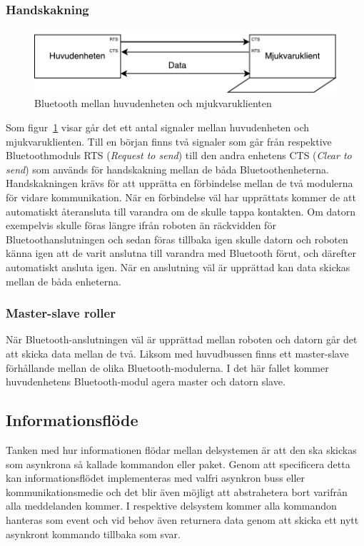 \documentclass{article}
\begin{document}
\subsubsection{Handskakning}
\begin{figure}[H]
\centering 
\includegraphics[scale=0.8]{Kommunikation_Bluetooth}
\caption{Bluetooth mellan huvudenheten och mjukvaruklienten}
\label{fig:Kommunikation_Bluetooth}
\end{figure}

Som figur~\ref{fig:Kommunikation_Bluetooth} visar går det ett antal signaler mellan huvudenheten och mjukvaruklienten. Till en början finns två signaler som går från respektive Bluetoothmoduls RTS (\textit{Request to send}) till den andra enhetens CTS (\textit{Clear to send}) som används för handskakning mellan de båda Bluetoothenheterna. Handskakningen krävs för att upprätta en förbindelse mellan de två modulerna för vidare kommunikation. När en förbindelse väl har upprättats kommer de att automatiskt återansluta till varandra om de skulle tappa kontakten. Om datorn exempelvis skulle föras längre ifrån roboten än räckvidden för Bluetoothanslutningen och sedan föras tillbaka igen skulle datorn och roboten känna igen att de varit anslutna till varandra med Bluetooth förut, och därefter automatiskt ansluta igen.
\newline\newline
När en anslutning väl är upprättad kan data skickas mellan de båda enheterna.

\subsubsection{Master-slave roller}
När Bluetooth-anslutningen väl är upprättad mellan roboten och datorn går det att skicka data mellan de två. Liksom med huvudbussen finns ett master-slave förhållande mellan de olika Bluetooth-modulerna. I det här fallet kommer huvudenhetens Bluetooth-modul agera master och datorn slave.

\subsection{Informationsflöde}
Tanken med hur informationen flödar mellan delsystemen är att den ska skickas som asynkrona så kallade kommandon eller paket. Genom att specificera detta kan informationsflödet implementeras med valfri asynkron buss eller kommunikationsmedie och det blir även möjligt att abstrahetera bort varifrån alla meddelanden kommer. I respektive delsystem kommer alla kommandon hanteras som event och vid behov även returnera data genom att skicka ett nytt asynkront kommando tillbaka som svar.
\end{document}
